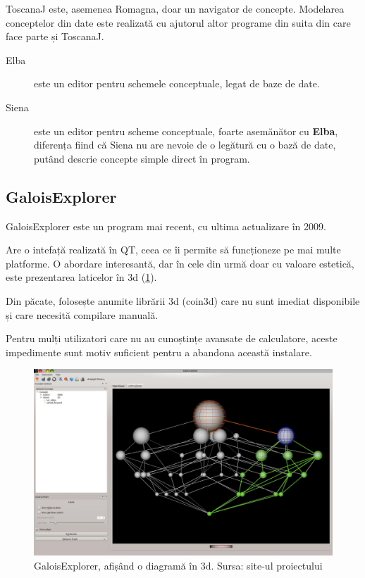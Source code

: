 \documentclass[12pt, a4paper, twoside, romanian]{teza-upb}
\begin{document}
        ToscanaJ este, asemenea Romagna, doar un navigator de concepte. Modelarea conceptelor din date este realizată cu ajutorul altor programe din suita din care face parte și ToscanaJ.

        \begin{description}
            \item[Elba] este un editor pentru schemele conceptuale, legat de baze de date.
            \item[Siena] este un editor pentru scheme conceptuale, foarte asemănător cu \textbf{Elba}, diferența fiind că Siena nu are nevoie de o legătură cu o bază de date, putând descrie concepte simple direct în program.
        \end{description}

  \subsection{GaloisExplorer}
    GaloisExplorer \cite{GaloisExplorer:homepage} este un program mai recent, cu ultima actualizare în 2009.

    Are o intefață realizată în QT, ceea ce îi permite să funcționeze pe mai multe platforme. O abordare interesantă, dar în cele din urmă doar cu valoare estetică, este prezentarea laticelor în 3d (\ref{screenshot:galoisexplorer}).
   
    Din păcate, folosește anumite librării 3d (coin3d\cite{Coin:homepage}) care nu sunt imediat disponibile și care necesită compilare manuală.

    Pentru mulți utilizatori care nu au cunoștințe avansate de calculatore, aceste impedimente sunt motiv suficient pentru a abandona această instalare.
    \begin{figure}[h]
      \centering
      \includegraphics[width=\textwidth]{GaloisExplorer_latticeView}
      \caption{GaloisExplorer, afișând o diagramă în 3d. Sursa: site-ul proiectului \cite{GaloisExplorer:sourceforge}}
      \label{screenshot:galoisexplorer}
    \end{figure}
\end{document}
